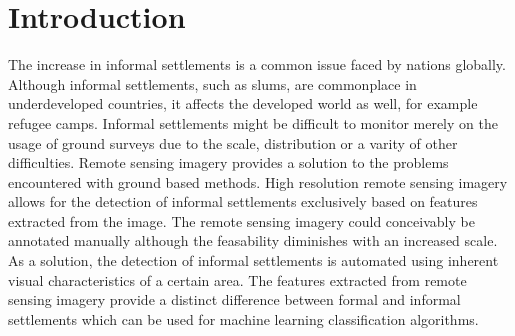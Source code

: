 \section{Introduction}

The increase in informal settlements is a common issue faced by nations
globally.  Although informal settlements, such as slums, are commonplace in
underdeveloped countries, it affects the developed world as well, for example
refugee camps. Informal settlements might be difficult to monitor merely on the
usage of ground surveys due to the scale, distribution or a varity of other
difficulties. Remote sensing imagery provides a solution to the problems
encountered with ground based methods.  High resolution remote sensing imagery
allows for the detection of informal settlements exclusively based on features
extracted from the image.  The remote sensing imagery could conceivably be
annotated manually although the feasability diminishes with an increased scale.
As a solution, the detection of informal settlements is automated using
inherent visual characteristics of a certain area. The features extracted from remote sensing imagery provide a distinct difference between formal and
informal settlements which can be used for machine learning classification
algorithms.
